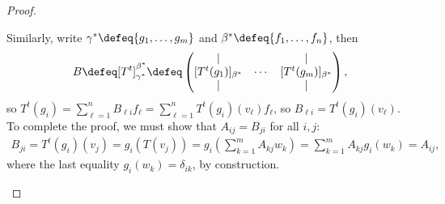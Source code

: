 \begin{proof}
\begin{enumerate}
        Similarly, write $\gamma^\ast \defeq \{g_1, \dots, g_m\}$ and $\beta^\ast\defeq \{f_1, \dots, f_n\}$, then $$B \defeq [T^t]_{\gamma^\ast}^{\beta^\ast} \defeq \begin{pmatrix}
            \vert & & \vert\\
            [T^t(g_1)]_{\beta^\ast} & \cdots & [T^t(g_m)]_{\beta^\ast}\\ 
            \vert & & \vert
        \end{pmatrix},$$
        so $T^t(g_i) = \sum_{\ell=1}^{n} B_{\ell i} f_\ell= \sum_{\ell=1}^n T^t(g_i)(v_\ell)f_\ell$, so $B_{\ell i} = T^t(g_i)(v_\ell)$. To complete the proof, we must show that $A_{ij} = B_{ji}$ for all $i,j$:
        \begin{align*}
            B_{ji} = T^t(g_i)(v_j) = g_i(T(v_j)) = g_i(\sum_{k=1}^m A_{kj} w_k) = \sum_{k=1}^m A_{kj} g_i(w_k) = A_{ij},
        \end{align*}
        where the last equality $g_i(w_k) = \delta_{ik}$, by construction.
    \end{enumerate}
\end{proof}


